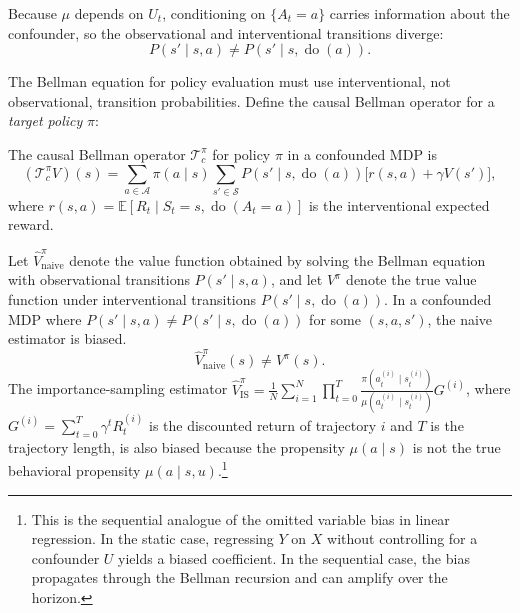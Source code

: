 Because $\mu$ depends on $U_t$, conditioning on $\{A_t = a\}$ carries information about the confounder, so the observational and interventional transitions diverge:
\begin{equation}
P(s' \mid s, a) \neq P(s' \mid s, \operatorname{do}(a)).
\label{eq:obs_vs_interventional}
\end{equation}

The Bellman equation for policy evaluation must use interventional, not observational, transition probabilities. Define the causal Bellman operator for a \textit{target policy} $\pi$:

\begin{definition}
\label{def:causal_bellman}
The causal Bellman operator $\mathcal{T}_c^\pi$ for policy $\pi$ in a confounded MDP is
\begin{equation}
(\mathcal{T}_c^\pi V)(s) = \sum_{a \in \mathcal{A}} \pi(a \mid s) \sum_{s' \in \mathcal{S}} P(s' \mid s, \operatorname{do}(a)) \bigl[ r(s, a) + \gamma V(s') \bigr],
\label{eq:causal_bellman}
\end{equation}
where $r(s,a) = \mathbb{E}[R_t \mid S_t = s, \operatorname{do}(A_t = a)]$ is the interventional expected reward.
\end{definition}

\begin{lemma}
\label{lem:naive_bias}
Let $\hat{V}^{\pi}_{\text{naive}}$ denote the value function obtained by solving the Bellman equation with observational transitions $P(s' \mid s, a)$, and let $V^\pi$ denote the true value function under interventional transitions $P(s' \mid s, \operatorname{do}(a))$. In a confounded MDP where $P(s' \mid s, a) \neq P(s' \mid s, \operatorname{do}(a))$ for some $(s, a, s')$, the naive estimator is biased.
\begin{equation}
\hat{V}^{\pi}_{\text{naive}}(s) \neq V^\pi(s).
\end{equation}
The importance-sampling estimator $\hat{V}^{\pi}_{\text{IS}} = \frac{1}{N} \sum_{i=1}^N \prod_{t=0}^{T} \frac{\pi(a_t^{(i)} \mid s_t^{(i)})}{\mu(a_t^{(i)} \mid s_t^{(i)})} G^{(i)}$, where $G^{(i)} = \sum_{t=0}^{T} \gamma^t R_t^{(i)}$ is the discounted return of trajectory $i$ and $T$ is the trajectory length, is also biased because the propensity $\mu(a \mid s)$ is not the true behavioral propensity $\mu(a \mid s, u)$.\footnote{This is the sequential analogue of the omitted variable bias in linear regression. In the static case, regressing $Y$ on $X$ without controlling for a confounder $U$ yields a biased coefficient. In the sequential case, the bias propagates through the Bellman recursion and can amplify over the horizon.}
\end{lemma}

